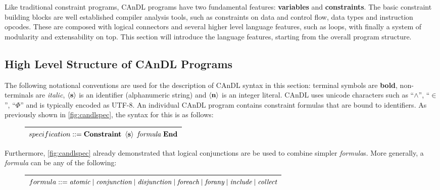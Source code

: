     Like traditional constraint programs, CAnDL programs have two
    fundamental features: \textbf{variables} and \textbf{constraints}.
    The basic constraint building blocks are well established compiler analysis
    tools, such as constraints on data and control flow, data types and
    instruction opcodes.
    These are composed with logical connectors and several higher level language
    features, such as loops, with finally a system of modularity and
    extensability on top.
    This section will introduce the language features,
    starting from the overall program structure.

\subsection{High Level Structure of CAnDL Programs}

    The following notational conventions are used for the description of CAnDL
    syntax in this section:
    terminal symbols are {\bf bold}, non-terminals are {\it italic},
    $\left<\text{\bf s}\right>$ is an identifier (alphanumeric string) and
    $\left<\text{\bf n}\right>$ is an integer literal.
    CAnDL uses unicode characters such as ``$\land$'', ``$\in$'', ``$\Phi$'' and
    is typically encoded as UTF-8.
    An individual CAnDL program contains constraint formulas that are
    bound to identifiers.
    As previously shown in \autoref{fig:candlspec}, the syntax for this is as
    follows:
\begin{figure}[H]
\centering
\begin{tabular}{|c|}
    \hline
    $specification ::= \text{\bf Constraint}\ \left<\text{\bf s}\right>\ \text{\it formula}\ \text{\bf End}$\\
    \hline
\end{tabular}
\end{figure}

    \noindent
    Furthermore, \autoref{fig:candlspec} already demonstrated that logical
    conjunctions are be used to combine simpler {\it formula}s.
    More generally, a {\it formula} can be any of the following:
\begin{figure}[H]
\centering
\begin{tabular}{|c|}
    \hline
    $formula ::= \text{\it atomic}\mid\text{\it conjunction}\mid\text{\it disjunction}\mid\text{\it foreach}\mid \text{\it forany}\mid\text{\it include}\mid\text{\it collect}$\\
    \hline
\end{tabular}
\end{figure}

